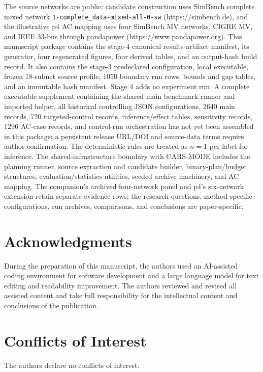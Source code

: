 \documentclass[energies,article,submit,moreauthors]{Definitions/mdpi}
\begin{document}
The source networks are public: candidate construction uses SimBench complete mixed network \texttt{1-complete\_data-mixed-all-0-sw} (https://simbench.de), and the illustrative p4 AC mapping uses four SimBench MV networks, CIGRE MV, and IEEE 33-bus through pandapower (https://www.pandapower.org). This manuscript package contains the stage-4 canonical results-artifact manifest, its generator, four regenerated figures, four derived tables, and an output-hash build record. It also contains the stage-3 predeclared configuration, local executable, frozen 18-subnet source profile, 1050 boundary run rows, bounds and gap tables, and an immutable hash manifest. Stage 4 adds no experiment run. A complete executable supplement containing the shared main benchmark runner and imported helper, all historical controlling JSON configurations, 2640 main records, 720 targeted-control records, inference/effect tables, sensitivity records, 1296 AC-case records, and control-run orchestration has not yet been assembled in this package; a persistent release URL/DOI and source-data terms require author confirmation. The deterministic rules are treated as \(n=1\) per label for inference. The shared-infrastructure boundary with CARS-MODE \cite{ref42} includes the planning runner, source extraction and candidate builder, binary-plan/budget structures, evaluation/statistics utilities, seeded archive machinery, and AC mapping. The companion's archived four-network panel and p4's six-network extension retain separate evidence rows; the research questions, method-specific configurations, run archives, comparisons, and conclusions are paper-specific.

\section*{Acknowledgments}

During the preparation of this manuscript, the authors used an AI-assisted coding environment for software development and a large language model for text editing and readability improvement. The authors reviewed and revised all assisted content and take full responsibility for the intellectual content and conclusions of the publication.

\section*{Conflicts of Interest}

The authors declare no conflicts of interest.
\end{document}
